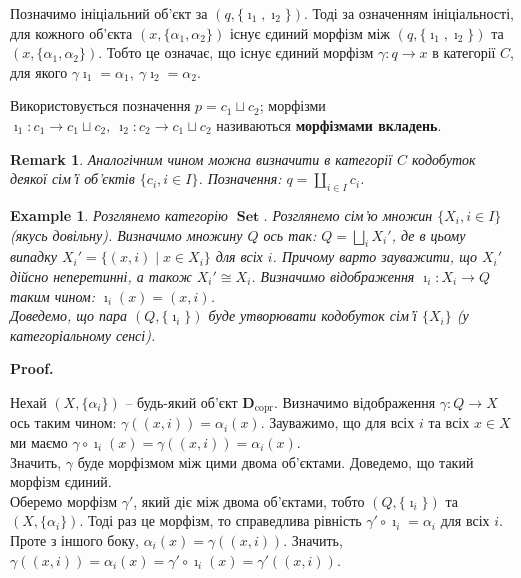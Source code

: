 \documentclass[a4paper, 10pt]{article}
\makeatletter
\theoremstyle{theoremdd}
\newtheorem{example}[theorem]{Example}
\newtheorem{remark}[theorem]{Remark}
\renewenvironment{proof}[1][Proof.\\]{\par
\pushQED{\hfill \qed}%
\normalfont \topsep6\p@\@plus6\p@\relax
\trivlist
\item\relax
{\bfseries
#1\@addpunct{.}}\hspace\labelsep\ignorespaces
}{%
\popQED\endtrivlist\@endpefalse
}
\DeclareMathOperator{\Set}{\textbf{Set}}
\makeatother
\begin{document}
\noindent Позначимо ініціальний об'єкт за $(q,\{\imath_1,\imath_2\})$. Тоді за означенням ініціальності, для кожного об'єкта $(x,\{\alpha_1,\alpha_2\})$ існує єдиний морфізм між $(q,\{\imath_1,\imath_2\})$ та $(x,\{\alpha_1,\alpha_2\})$. Тобто це означає, що існує єдиний морфізм $\gamma \colon q \to x$ в категорії $C$, для якого $\gamma \imath_1 = \alpha_1,\ \gamma \imath_2 = \alpha_2$.
\begin{figure}[H]
\centering
{}
\end{figure}
\noindent  Використовується позначення $p = c_1 \sqcup c_2$; морфізми $\imath_1 \colon c_1 \to c_1 \sqcup c_2,\ \imath_2 \colon c_2 \to c_1 \sqcup c_2$ називаються \textbf{морфізмами вкладень}.

\begin{remark}
Аналогічним чином можна визначити в категорії $C$ кодобуток деякої сім'ї об'єктів $\{c_i, i \in I\}$. Позначення: $q = \displaystyle\coprod_{i \in I} c_i$.
\end{remark}

\begin{example}
Розглянемо категорію $\Set$. Розглянемо сім'ю множин $\{X_i, i \in I\}$ (якусь довільну). Визначимо множину $Q$ ось так: $Q = \displaystyle\bigsqcup_{i} X_i'$, де в цьому випадку $X_i' = \{(x,i) \mid x \in X_i\}$ для всіх $i$. Причому варто зауважити, що $X_i'$ дійсно неперетинні, а також $X_i' \cong X_i$. Визначимо відображення $\imath_i \colon X_i \to Q$ таким чином: $\imath_i(x) = (x,i)$.\\
Доведемо, що пара $(Q,\{\imath_i\})$ буде утворювати кодобуток сім'ї $\{X_i\}$ (у категоріальному сенсі).
\end{example}

\begin{proof}
Нехай $(X,\{\alpha_i\})$ -- будь-який об'єкт $\textbf{D}_{\text{copr}}$. Визначимо відображення $\gamma \colon Q \to X$ ось таким чином: $\gamma((x,i)) = \alpha_i(x)$. Зауважимо, що для всіх $i$ та всіх $x \in X$ ми маємо $\gamma \circ \imath_i(x) = \gamma((x,i)) = \alpha_i(x)$.\\
Значить, $\gamma$ буде морфізмом між цими двома об'єктами. Доведемо, що такий морфізм єдиний.\\
Оберемо морфізм $\gamma'$, який діє між двома об'єктами, тобто $(Q,\{\imath_i\})$ та $(X,\{\alpha_i\})$. Тоді раз це морфізм, то справедлива рівність $\gamma' \circ \imath_i = \alpha_i$ для всіх $i$. Проте з іншого боку, $\alpha_i(x) = \gamma((x,i))$. Значить, $\gamma((x,i)) = \alpha_i(x) = \gamma' \circ \imath_i (x) = \gamma'((x,i))$.
\end{proof}
\end{document}
